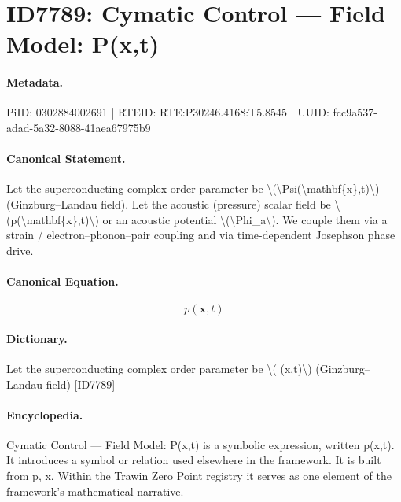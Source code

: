 \section*{ID7789: Cymatic Control — Field Model: P(x,t)}
\paragraph{Metadata.}
PiID: 0302884002691 | RTEID: RTE:P30246.4168:T5.8545 | UUID: fcc9a537-adad-5a32-8088-41aea67975b9

\paragraph{Canonical Statement.}
Let the superconducting complex order parameter be \textbackslash{}(\textbackslash{}Psi(\textbackslash{}mathbf\{x\},t)\textbackslash{}) (Ginzburg–Landau field). Let the acoustic (pressure) scalar field be \textbackslash{}(p(\textbackslash{}mathbf\{x\},t)\textbackslash{}) or an acoustic potential \textbackslash{}(\textbackslash{}Phi\_a\textbackslash{}). We couple them via a strain / electron–phonon–pair coupling and via time-dependent Josephson phase drive.

\paragraph{Canonical Equation.}
\[
p(\mathbf{x},t)
\]

\paragraph{Dictionary.}
Let the superconducting complex order parameter be \textbackslash{}( (x,t)\textbackslash{}) (Ginzburg–Landau field) [ID7789]

\paragraph{Encyclopedia.}
Cymatic Control — Field Model: P(x,t) is a symbolic expression, written p(x,t). It introduces a symbol or relation used elsewhere in the framework. It is built from p, x. Within the Trawin Zero Point registry it serves as one element of the framework's mathematical narrative.
